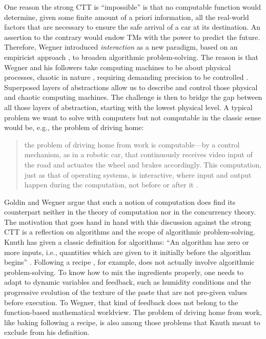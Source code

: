 \documentclass[a4paper, 11pt, twoside]{article}
\begin{document}
One reason the strong CTT is ``impossible'' \parencite{Eberbach2004} is that no computable function would determine, given some finite amount of a priori information, all the real-world factors that are necessary to ensure the safe arrival of a car at its destination. An assertion to the contrary would endow TMs with the power to predict the future. 
Therefore, Wegner introduced \textit{interaction} as a new paradigm, based on an empiricist approach \parencite{Wegner1995}, to broaden algorithmic problem-solving. The reason is that Wegner and his followers take computing machines to be about physical processes, chaotic in nature \parencite{Siegelmann1995}, requiring demanding precision to be controlled \parencite{Hartmanis1994}. Superposed layers of abstractions allow us to describe and control those physical and chaotic computing machines. The challenge is then to bridge the gap between all those layers of abstraction, starting with the lowest physical level. A typical problem we want to solve with computers but not computable in the classic sense would be, e.g., the problem of driving home: 

\begin{quote}
the problem of driving home from work is computable---by a control mechanism, as in a robotic car, that continuously receives video input of the road and actuates the wheel and brakes accordingly. This computation, just as that of operating systems, is interactive, where input and output happen during the computation, not before or after it \parencite{Goldin2008}.
\end{quote}

Goldin and Wegner argue that such a notion of computation does find its counterpart neither in the theory of computation nor in the concurrency theory.
The motivation that goes hand in hand with this discussion against the strong CTT is a reflection on algorithms and the scope of algorithmic problem-solving. Knuth has given a classic definition for algorithms: ``An algorithm has zero or more inputs, i.e., quantities which are given to it initially before the algorithm begins'' \parencite{Knuth1968}. Following a recipe \parencite{Knuth1968}, for example, does not actually involve algorithmic problem-solving. To know how to mix the ingredients properly, one needs to adapt to dynamic variables and feedback, such as humidity conditions and the progressive evolution of the texture of the paste that are not pre-given values before execution. To Wegner, that kind of feedback does not belong to the function-based mathematical worldview. The problem of driving home from work, like baking following a recipe, is also among those problems that Knuth meant to exclude from his definition. 
\end{document}
